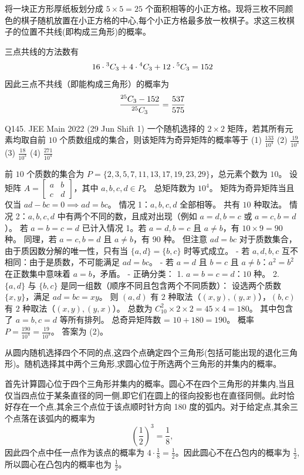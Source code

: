 \begin{questions}
    \question 将一块正方形厚纸板划分成 $5 \times 5 = 25$ 个面积相等的小正方格。现将三枚不同颜色的棋子随机放置在小正方格的中心,每个小正方格最多放一枚棋子。求这三枚棋子的位置不共线(即构成三角形)的概率。
    \begin{solution}
        三点共线的方法数有
        \[
        16 \cdot {}^{3}C_{3} + 4 \cdot {}^{4}C_{3} + 12 \cdot {}^{5}C_{3} =152
        \]
        因此三点不共线（即能构成三角形）的概率为
        \[
        \frac{{}^{25}C_{3} - 152}{{}^{25}C_{3}} = \frac{537}{575}
        \]
    \end{solution}

    \question
Q145. JEE Main 2022 (29 Jun Shift 1)
一个随机选择的 $2 \times 2$ 矩阵，若其所有元素均取自前 $10$ 个质数组成的集合，则该矩阵为奇异矩阵的概率等于
(1) $\frac{133}{10^4}$ \quad (2) $\frac{19}{10^3}$ \quad (3) $\frac{18}{10^3}$ \quad (4) $\frac{271}{10^4}$

\begin{solution}
前 $10$ 个质数的集合为 $P = \{2, 3, 5, 7, 11, 13, 17, 19, 23, 29\}$，总元素个数为 $10$。
设矩阵 $A = \begin{bmatrix} a & b \\ c & d \end{bmatrix}$，其中 $a, b, c, d \in P$。
总矩阵数为 $10^4$。
矩阵为奇异矩阵当且仅当 $ad - bc = 0 \implies ad = bc$。
情况 1：$a, b, c, d$ 全部相等。
共有 $10$ 种取法。
情况 2：$a, b, c, d$ 中有两个不同的数，且成对出现（例如 $a=d, b=c$ 或 $a=c, b=d$）。
若 $a=b=c=d$ 已计入情况 1。若 $a=d, b=c$ 且 $a \neq b$，有 $10 \times 9 = 90$ 种。
同理，若 $a=c, b=d$ 且 $a \neq b$，有 $90$ 种。
但注意 $ad=bc$ 对于质数集合，由于质因数分解的唯一性，只有当 $\{a, d\} = \{b, c\}$ 时等式成立。
- 若 $a, d, b, c$ 互不相同：由于是质数，不可能满足 $ad=bc$。
- 若 $a=d$ 且 $b=c$ 且 $a \neq b$：$a^2 = b^2$ 在正数集中意味着 $a=b$，矛盾。
- 正确分类：
  1. $a=b=c=d$：$10$ 种。
  2. $\{a, d\}$ 与 $\{b, c\}$ 是同一组数（顺序不同且包含两个不同质数）：
     设选两个质数 $\{x, y\}$，满足 $ad=bc=xy$。
     则 $(a,d)$ 有 $2$ 种取法（$(x,y), (y,x)$），$(b,c)$ 有 $2$ 种取法（$(x,y), (y,x)$）。
     总数为 $C_{10}^2 \times 2 \times 2 = 45 \times 4 = 180$。
     其中包含了 $a=b, c=d$ 等所有排列。
总奇异矩阵数 = $10 + 180 = 190$。
概率 $P = \frac{190}{10^4} = \frac{19}{10^3}$。
答案为 (2)。
\end{solution}

\question 从圆内随机选择四个不同的点,这四个点确定四个三角形(包括可能出现的退化三角形)。随机选择其中两个三角形,求圆心位于所选两个三角形的并集内的概率。
\begin{solution}
首先计算圆心位于四个三角形并集内的概率。圆心不在四个三角形的并集内,当且仅当四点位于某条直径的同一侧,即它们在圆上的径向投影也在直径同侧。此时恰好存在一个点,其余三个点位于该点顺时针方向 180 度的弧内。对于给定点,其余三个点落在该弧内的概率为
\[
\left(\frac{1}{2}\right)^3 = \frac{1}{8},
\]
因此四个点中任一点作为该点的概率为 $4 \cdot \frac{1}{8} = \frac{1}{2}$。因此圆心不在凸包内的概率为 $\frac{1}{2}$,所以圆心在凸包内的概率也为 $\frac{1}{2}$。


\end{solution}
\end{questions}
